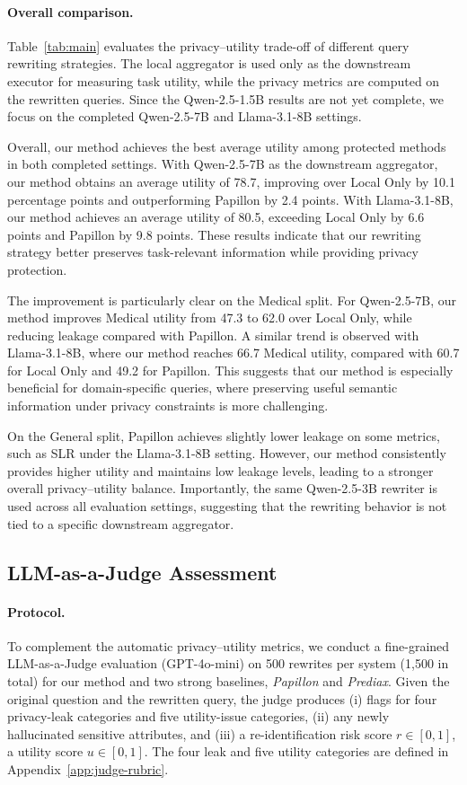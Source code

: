 \paragraph{Overall comparison.} Table~\ref{tab:main} evaluates the privacy--utility trade-off of different query rewriting strategies. The local aggregator is used only as the downstream executor for measuring task utility, while the privacy metrics are computed on the rewritten queries. Since the Qwen-2.5-1.5B results are not yet complete, we focus on the completed Qwen-2.5-7B and Llama-3.1-8B settings.

Overall, our method achieves the best average utility among protected methods in both completed settings. With Qwen-2.5-7B as the downstream aggregator, our method obtains an average utility of 78.7, improving over Local Only by 10.1 percentage points and outperforming Papillon by 2.4 points. With Llama-3.1-8B, our method achieves an average utility of 80.5, exceeding Local Only by 6.6 points and Papillon by 9.8 points. These results indicate that our rewriting strategy better preserves task-relevant information while providing privacy protection.

The improvement is particularly clear on the Medical split. For Qwen-2.5-7B, our method improves Medical utility from 47.3 to 62.0 over Local Only, while reducing leakage compared with Papillon. A similar trend is observed with Llama-3.1-8B, where our method reaches 66.7 Medical utility, compared with 60.7 for Local Only and 49.2 for Papillon. This suggests that our method is especially beneficial for domain-specific queries, where preserving useful semantic information under privacy constraints is more challenging.

On the General split, Papillon achieves slightly lower leakage on some metrics, such as SLR under the Llama-3.1-8B setting. However, our method consistently provides higher utility and maintains low leakage levels, leading to a stronger overall privacy--utility balance. Importantly, the same Qwen-2.5-3B rewriter is used across all evaluation settings, suggesting that the rewriting behavior is not tied to a specific downstream aggregator.

\subsection{LLM-as-a-Judge Assessment}
\label{sec:llm-judge}

\paragraph{Protocol.}
To complement the automatic privacy--utility metrics, we conduct a
fine-grained LLM-as-a-Judge evaluation (GPT-4o-mini) on 500 rewrites per
system (1{,}500 in total) for our method and two strong baselines,
\emph{Papillon} and \emph{Prediax}. Given the original question and the
rewritten query, the judge produces (i) flags for four privacy-leak
categories and five utility-issue categories, (ii) any newly
hallucinated sensitive attributes, and (iii) a re-identification risk
score $r\in[0,1]$, a utility score $u\in[0,1]$. The four leak
and five utility categories are defined in
Appendix~\ref{app:judge-rubric}.

